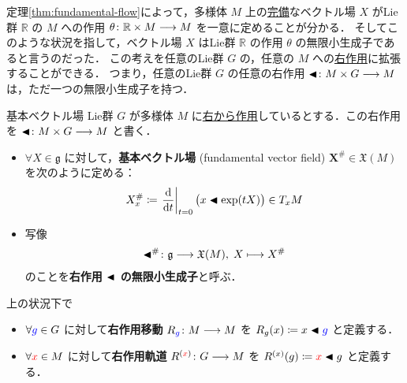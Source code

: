 \documentclass[geometry_main]{subfiles}
\begin{document}
定理\ref{thm:fundamental-flow}によって，\cinfty 多様体 $M$ 上の\hyperref[def:vecf-complete]{完備}なベクトル場 $X$ がLie群 $\mathbb{R}$ の $M$ への作用 $\theta \colon \mathbb{R} \times M \longrightarrow M$ を一意に定めることが分かる．
そしてこのような状況を指して，ベクトル場 $X$ はLie群 $\mathbb{R}$ の作用 $\theta$ の無限小生成子であると言うのだった．
この考えを任意のLie群 $G$ の，任意の $M$ への\underline{右作用}に拡張することができる．
つまり，任意のLie群 $G$ の任意の右作用 $\blacktriangleleft \colon M \times G \longrightarrow M$ は，ただ一つの無限小生成子を持つ．

\begin{mydef}[label=def:fundamental-vecf]{基本ベクトル場}
    Lie群 $G$ が\cinfty 多様体 $M$ に\hyperref[def:Lie-action]{右から作用}しているとする．この右作用を $\blacktriangleleft \colon M \times G \longrightarrow M$ と書く．
    \begin{itemize}
        \item $\forall X \in \mathfrak{g}$ に対して，\textbf{基本ベクトル場} (fundamental vector field) $\bm{X^{\#}} \in \mathfrak{X}(M)$ を次のように定める：
        \begin{align}
            X^{\#}_x \coloneqq \eval{\dv{}{t}}_{t=0} \bigl(x \btl \exp(tX)\bigr) \in T_x M
        \end{align}
        \item 写像
        \begin{align}
            \blacktriangleleft^{\#} \colon \mathfrak{g} \longrightarrow \mathfrak{X}(M),\; X \longmapsto X^\#
        \end{align}
        のことを\textbf{右作用 $\blacktriangleleft$ の無限小生成子}と呼ぶ．
    \end{itemize}
    \tcblower
    上の状況下で
    \begin{itemize}
        \item $\forall \textcolor{blue}{g} \in G$ に対して\textbf{右作用移動} $R_{\textcolor{blue}{g}} \colon M \longrightarrow M$ を $R_g (x) \coloneqq x \blacktriangleleft \textcolor{blue}{g}$ と定義する．
        \item $\forall \textcolor{red}{x} \in M$ に対して\textbf{右作用軌道} $R^{(\textcolor{red}{x})} \colon G \longrightarrow M$ を $R^{(x)} (g) \coloneqq \textcolor{red}{x} \blacktriangleleft g$ と定義する．
    \end{itemize}
\end{mydef}
\end{document}
